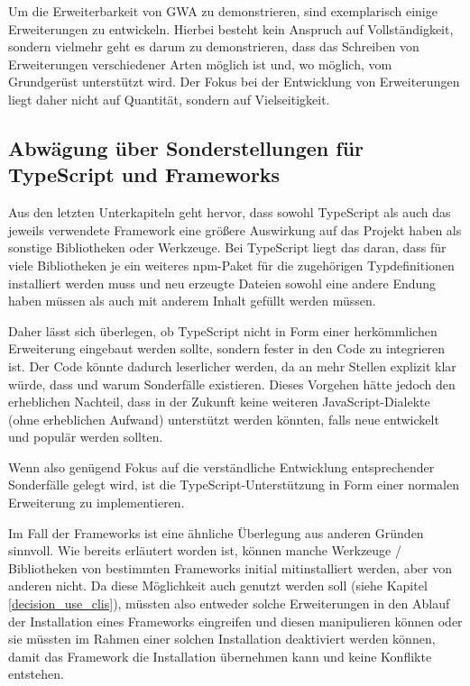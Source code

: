 Um die Erweiterbarkeit von \gls{GWA} zu demonstrieren, sind exemplarisch einige Erweiterungen zu entwickeln. Hierbei besteht kein Anspruch auf Vollständigkeit, sondern vielmehr geht es darum zu demonstrieren, dass das Schreiben von Erweiterungen verschiedener Arten möglich ist und, wo möglich, vom Grundgerüst unterstützt wird. Der Fokus bei der Entwicklung von Erweiterungen liegt daher nicht auf Quantität, sondern auf Vielseitigkeit.

\subsection{Abwägung über Sonderstellungen für TypeScript und Frameworks}
Aus den letzten Unterkapiteln geht hervor, dass sowohl TypeScript als auch das jeweils verwendete Framework eine größere Auswirkung auf das Projekt haben als sonstige Bibliotheken oder Werkzeuge. Bei TypeScript liegt das daran, dass für viele Bibliotheken je ein weiteres \gls{npm}-Paket für die zugehörigen Typdefinitionen installiert werden muss und neu erzeugte Dateien sowohl eine andere Endung haben müssen als auch mit anderem Inhalt gefüllt werden müssen.

Daher lässt sich überlegen, ob TypeScript nicht in Form einer herkömmlichen Erweiterung eingebaut werden sollte, sondern fester in den Code zu integrieren ist. Der Code könnte dadurch leserlicher werden, da an mehr Stellen explizit klar würde, dass und warum Sonderfälle existieren. Dieses Vorgehen hätte jedoch den erheblichen Nachteil, dass in der Zukunft keine weiteren JavaScript-Dialekte (ohne erheblichen Aufwand) unterstützt werden könnten, falls neue entwickelt und populär werden sollten.

Wenn also genügend Fokus auf die verständliche Entwicklung entsprechender Sonderfälle gelegt wird, ist die TypeScript-Unterstützung in Form einer normalen Erweiterung zu implementieren.

Im Fall der Frameworks ist eine ähnliche Überlegung aus anderen Gründen sinnvoll. Wie bereits erläutert worden ist, können manche Werkzeuge / Bibliotheken von bestimmten Frameworks initial mitinstalliert werden, aber von anderen nicht. Da diese Möglichkeit auch genutzt werden soll (siehe Kapitel \ref{decision_use_clis}), müssten also entweder solche Erweiterungen in den Ablauf der Installation eines Frameworks eingreifen und diesen manipulieren können oder sie müssten im Rahmen einer solchen Installation deaktiviert werden können, damit das Framework die Installation übernehmen kann und keine Konflikte entstehen.

